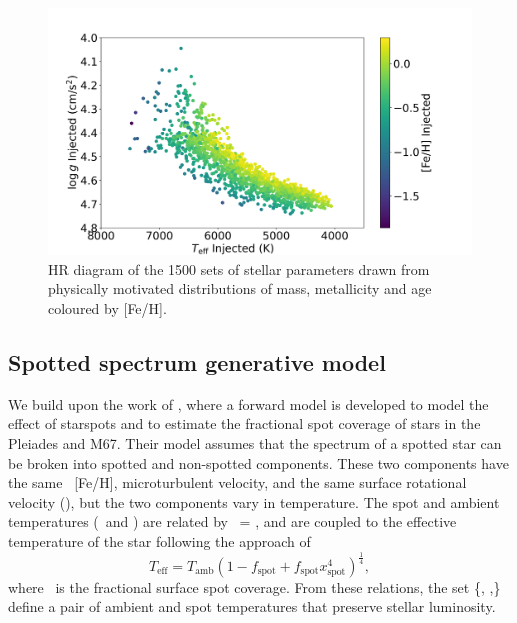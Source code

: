 \begin{figure}
    \includegraphics[width=\textwidth]{Figures/ss_chapter_figures/injected_hr.png}
    \caption[HR diagram of the 1500 sets of stellar parameters drawn from physically motivated distributions of mass{,} metallicity and age coloured by \feh.]{HR diagram of the 1500 sets of stellar parameters drawn from physically motivated distributions of mass, metallicity and age coloured by [Fe/H].}
    \label{fig:HR}
\end{figure}


\subsection{Spotted spectrum generative model}

\label{sec:gen}
We build upon the work of \citep{cao_starspots_2022}, where a forward model is developed to model the effect of starspots and to estimate the fractional spot coverage of stars in the Pleiades and M67. Their model assumes that the spectrum of a spotted star can be broken into spotted and non-spotted components. These two components have the same \logg\, [Fe/H], microturbulent velocity, and the same surface rotational velocity (\vsini), but the two components vary in temperature. The spot and ambient temperatures (\tspot\ and \tamb) are related by \tspot\  = \xspot \tamb, and are coupled to the effective temperature of the star following the approach of \citet{somers_impact_2015}
\begin{equation}
    T_{\text{eff}} = T_{\text{amb}}(1 - f_{\text{spot}} + f_{\text{spot}}x_{\text{spot}}^{4} )^{\frac{1}{4}},
    \label{eq:teff}
\end{equation}
where \fspot \ is the fractional surface spot coverage. From these relations, the set \{\teff, \xspot,\fspot\} define a pair of ambient and spot temperatures that preserve stellar luminosity.

